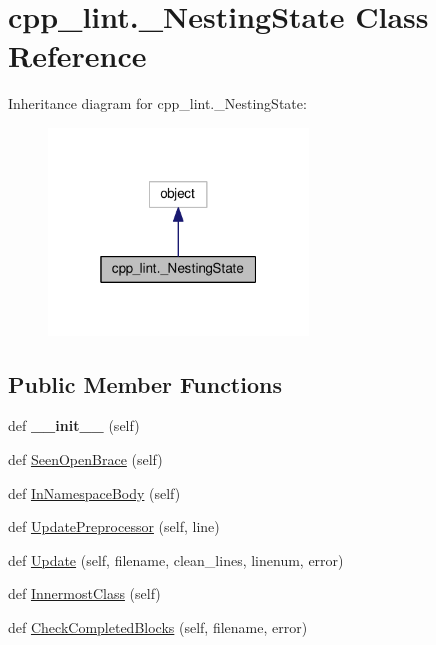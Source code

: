 \hypertarget{classcpp__lint_1_1___nesting_state}{}\section{cpp\+\_\+lint.\+\_\+\+Nesting\+State Class Reference}
\label{classcpp__lint_1_1___nesting_state}


Inheritance diagram for cpp\+\_\+lint.\+\_\+\+Nesting\+State\+:
\nopagebreak
\begin{figure}[H]
\begin{center}
\leavevmode
\includegraphics[width=196pt]{classcpp__lint_1_1___nesting_state__inherit__graph}
\end{center}
\end{figure}
\subsection*{Public Member Functions}
\begin{DoxyCompactItemize}
\item 
\mbox{\label{classcpp__lint_1_1___nesting_state_a7ca0090ee1749af80736a47e0d4c85e5}} 
def {\bfseries \+\_\+\+\_\+init\+\_\+\+\_\+} (self)
\item 
def \mbox{\hyperlink{classcpp__lint_1_1___nesting_state_a19f7e1db39b5e5bcdac60560dfaaf895}{Seen\+Open\+Brace}} (self)
\item 
def \mbox{\hyperlink{classcpp__lint_1_1___nesting_state_a8add51b250bd6004e4bb25669d274c3f}{In\+Namespace\+Body}} (self)
\item 
def \mbox{\hyperlink{classcpp__lint_1_1___nesting_state_a078812aa9c30a2f75bb93214fa8ee4f2}{Update\+Preprocessor}} (self, line)
\item 
def \mbox{\hyperlink{classcpp__lint_1_1___nesting_state_a8ffa3f80c9867b44c7c6d28ed88ffe1e}{Update}} (self, filename, clean\+\_\+lines, linenum, error)
\item 
def \mbox{\hyperlink{classcpp__lint_1_1___nesting_state_a19adbe5a4b2f7baef867ee9385bf29af}{Innermost\+Class}} (self)
\item 
def \mbox{\hyperlink{classcpp__lint_1_1___nesting_state_acacead3c8a88971753e46ac7a054e98f}{Check\+Completed\+Blocks}} (self, filename, error)
\end{DoxyCompactItemize}
